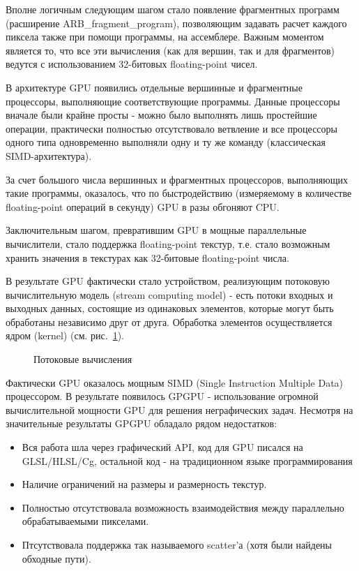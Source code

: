 Вполне логичным следующим шагом стало появление фрагментных программ (расширение ARB\_fragment\_program), позволяющим задавать расчет каждого пиксела также при помощи программы, на ассемблере. Важным моментом является то, что все эти вычисления (как для вершин, так и для фрагментов) ведутся с использованием 32-битовых floating-point чисел.

В архитектуре GPU появились отдельные вершинные и фрагментные процессоры, выполняющие соответствующие программы. Данные процессоры вначале были крайне просты - можно было выполнять лишь простейшие операции, практически полностью отсутствовало ветвление и все процессоры одного типа одновременно выполняли одну и ту же команду (классическая SIMD-архитектура).

За счет большого числа вершинных и фрагментных процессоров, выполняющих такие программы, оказалось, что по быстродействию (измеряемому в количестве floating-point операций в секунду) GPU в разы обгоняют CPU.

Заключительным шагом, превратившим GPU в мощные параллельные вычислители, стало поддержка floating-point текстур, т.е. стало возможным хранить значения в текстурах как 32-битовые floating-point числа.

В результате GPU фактически стало устройством, реализующим потоковую вычислительную модель (stream computing model) - есть потоки входных и выходных данных, состоящие из одинаковых элементов, которые могут быть обработаны независимо друг от друга. Обработка элементов осуществляется ядром (kernel) (см. рис.~\ref{gpu-programming-1}).
\begin{figure}[h]
\caption{\small{Потоковые вычисления}}
\label{gpu-programming-1}
\end{figure}

Фактически GPU оказалось мощным SIMD (Single Instruction Multiple Data) процессором. В результате появилось GPGPU - использование огромной вычислительной мощности GPU для решения неграфических задач. Несмотря на значительные результаты GPGPU обладало рядом недостатков:
\begin{itemize}
\item Вся работа шла через графический API, код для GPU писался на GLSL/HLSL/Cg, остальной код - на традиционном языке программирования
\item Наличие ограничений на размеры и размерность текстур.
\item Полностью отсутствовала возможность взаимодействия между параллельно обрабатываемыми пикселами.
\item Птсутствовала поддержка так называемого scatter'а (хотя были найдены обходные пути).
\end{itemize}

